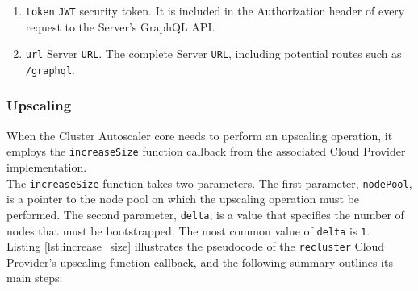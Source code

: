 \begin{enumerate}
  \item \texttt{token}
    \newline
    \texttt{JWT} security token.
    \newline
    It is included in the Authorization header of every request to the Server's
    GraphQL API.

  \item \texttt{url}
    \newline
    Server \texttt{URL}.
    \newline
    The complete Server \texttt{URL}, including potential routes such as \texttt{/graphql}.
\end{enumerate}

\subsubsection{Upscaling}
\label{subsubsec:implementation_autoscaling_cluster_autoscaler_upscaling}

When the Cluster Autoscaler core needs to perform an upscaling operation, it
employs the \texttt{increaseSize} function callback from the associated Cloud Provider
implementation. \\ %

The \texttt{increaseSize} function takes two parameters. The first parameter, \texttt{nodePool},
is a pointer to the node pool on which the upscaling operation must be performed.
The second parameter, \texttt{delta}, is a value that specifies the number of nodes
that must be bootstrapped. The most common value of \texttt{delta} is \texttt{1}.
\\ %
Listing \ref{lst:increase_size} illustrates the pseudocode of the \texttt{recluster}
Cloud Provider's upscaling function callback, and the following summary outlines
its main steps:

